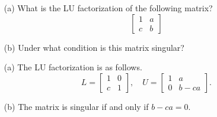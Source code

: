 \begin{pro}
  \begin{itemize}
  \item[(a)]
    What is the LU factorization of the following matrix?
    \begin{displaymath}
      \begin{bmatrix}
        1 & a \\
        c & b
      \end{bmatrix}
    \end{displaymath}

  \item[(b)]
    Under what condition is this matrix singular?
  \end{itemize}
\end{pro}

\begin{sol}
  \begin{itemize}
  \item[(a)]
    The LU factorization is as follows.
    \begin{displaymath}
      L =
      \begin{bmatrix}
        1 & 0 \\
        c & 1
      \end{bmatrix},
      \quad 
      U =
      \begin{bmatrix}
        1 & a \\
        0 & b-ca
      \end{bmatrix}.
    \end{displaymath}

  \item[(b)]
    The matrix is singular if and only if $b-ca=0$.
  \end{itemize}
\end{sol}
